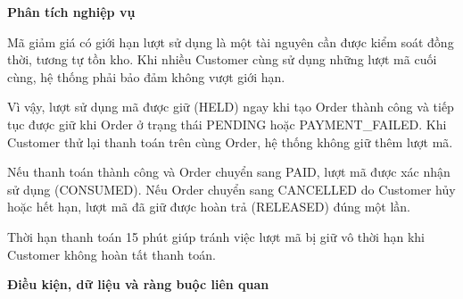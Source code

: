 \documentclass[11pt,a4paper,oneside]{report}
\begin{document}
\textbf{Phân tích nghiệp vụ}

Mã giảm giá có giới hạn lượt sử dụng là một tài nguyên cần được kiểm soát đồng thời, tương tự tồn kho. Khi nhiều Customer cùng sử dụng những lượt mã cuối cùng, hệ thống phải bảo đảm không vượt giới hạn.

Vì vậy, lượt sử dụng mã được giữ (HELD) ngay khi tạo Order thành công và tiếp tục được giữ khi Order ở trạng thái PENDING hoặc PAYMENT\_FAILED. Khi Customer thử lại thanh toán trên cùng Order, hệ thống không giữ thêm lượt mã.

Nếu thanh toán thành công và Order chuyển sang PAID, lượt mã được xác nhận sử dụng (CONSUMED). Nếu Order chuyển sang CANCELLED do Customer hủy hoặc hết hạn, lượt mã đã giữ được hoàn trả (RELEASED) đúng một lần.

Thời hạn thanh toán 15 phút giúp tránh việc lượt mã bị giữ vô thời hạn khi Customer không hoàn tất thanh toán.

\textbf{Điều kiện, dữ liệu và ràng buộc liên quan}
\end{document}
